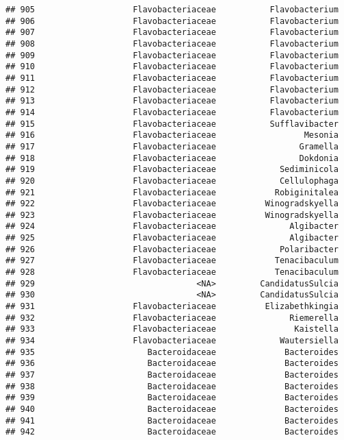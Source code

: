\documentclass[
]{article}
\begin{document}
\begin{verbatim}
## 905                    Flavobacteriaceae           Flavobacterium
## 906                    Flavobacteriaceae           Flavobacterium
## 907                    Flavobacteriaceae           Flavobacterium
## 908                    Flavobacteriaceae           Flavobacterium
## 909                    Flavobacteriaceae           Flavobacterium
## 910                    Flavobacteriaceae           Flavobacterium
## 911                    Flavobacteriaceae           Flavobacterium
## 912                    Flavobacteriaceae           Flavobacterium
## 913                    Flavobacteriaceae           Flavobacterium
## 914                    Flavobacteriaceae           Flavobacterium
## 915                    Flavobacteriaceae           Sufflavibacter
## 916                    Flavobacteriaceae                  Mesonia
## 917                    Flavobacteriaceae                 Gramella
## 918                    Flavobacteriaceae                 Dokdonia
## 919                    Flavobacteriaceae             Sediminicola
## 920                    Flavobacteriaceae             Cellulophaga
## 921                    Flavobacteriaceae            Robiginitalea
## 922                    Flavobacteriaceae          Winogradskyella
## 923                    Flavobacteriaceae          Winogradskyella
## 924                    Flavobacteriaceae               Algibacter
## 925                    Flavobacteriaceae               Algibacter
## 926                    Flavobacteriaceae             Polaribacter
## 927                    Flavobacteriaceae            Tenacibaculum
## 928                    Flavobacteriaceae            Tenacibaculum
## 929                                 <NA>         CandidatusSulcia
## 930                                 <NA>         CandidatusSulcia
## 931                    Flavobacteriaceae          Elizabethkingia
## 932                    Flavobacteriaceae               Riemerella
## 933                    Flavobacteriaceae                Kaistella
## 934                    Flavobacteriaceae             Wautersiella
## 935                       Bacteroidaceae              Bacteroides
## 936                       Bacteroidaceae              Bacteroides
## 937                       Bacteroidaceae              Bacteroides
## 938                       Bacteroidaceae              Bacteroides
## 939                       Bacteroidaceae              Bacteroides
## 940                       Bacteroidaceae              Bacteroides
## 941                       Bacteroidaceae              Bacteroides
## 942                       Bacteroidaceae              Bacteroides

\end{verbatim}
\end{document}
